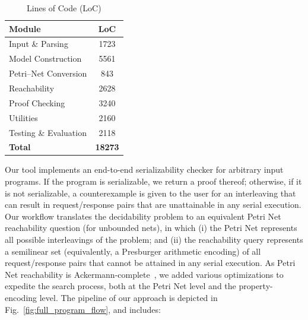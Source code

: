 %
%
\begin{table}
	\centering
	\begin{tabular}{@{} l S[table-format=5.0] @{}}
		\toprule
		\textbf{Module}                & {\textbf{LoC}} \\
		\midrule
		Input \& Parsing               &  1723          \\
		Model Construction             &  5561          \\
		Petri–Net Conversion           &   843          \\
		Reachability          &  2628          \\
		Proof Checking                 &  3240          \\
		Utilities                      &  2160          \\
		Testing \& Evaluation          &  2118          \\
		\midrule
		\textbf{Total}                 & \textbf{18273} \\
		\bottomrule
	\end{tabular}
	\caption{Lines of Code (LoC)}
	\label{tab:loc_summary2}
\end{table}
%
%
Our tool implements an end-to-end serializability checker for arbitrary input programs. If the program is serializable, we return a proof thereof; otherwise, if it is not serializable, a counterexample is given to the user for an interleaving that can result in request/response pairs that are unattainable in any serial execution.
%
Our workflow translates the decidability problem to an equivalent Petri Net reachability question (for unbounded nets), in which (i) the Petri Net represents all possible interleavings of the problem; and (ii) the reachability query represents a semilinear set (equivalently, a Presburger arithmetic encoding) of all request/response pairs that cannot be attained in any serial execution.
%
As Petri Net reachability is Ackermann-complete~\cite{CzWo22}, we added various optimizations to expedite the search process, both at the Petri Net level and the property-encoding level.
%
The pipeline of our approach is depicted in Fig.~\ref{fig:full_program_flow}, and includes:
 

